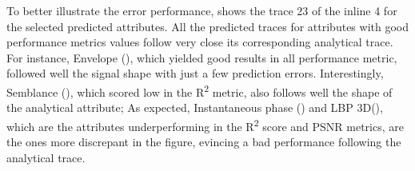 \documentclass[conference]{IEEEtran}
\def\lbp{LBP 3D\xspace}
\def\RTwo{R\textsuperscript{2}\xspace}
\begin{document}

To better illustrate the error performance,  shows the trace 23 of the inline 4 for the selected predicted attributes. %
%
All the predicted traces for attributes with good performance metrics values follow very close its corresponding analytical trace. For instance, Envelope (), which yielded good results in all performance metric, followed well the signal shape with just a few prediction errors. 
Interestingly, Semblance (), which scored low in the \RTwo metric, also follows well the shape of the analytical attribute; 
As expected, Instantaneous phase () and \lbp (), which are the attributes underperforming in the \RTwo score and PSNR metrics, are the ones more discrepant in the figure,
evincing a bad performance following the analytical trace. %
%
\end{document}
